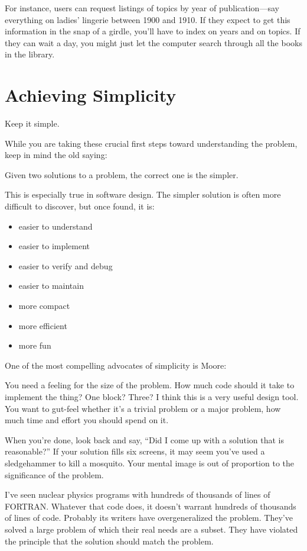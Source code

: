 For instance, users can request listings of topics by year of
publication---say everything on ladies' lingerie between 1900 and
1910.  If they expect to get this information in the snap of a girdle,
you'll have to index on years and on topics. If they can wait a day,
you might just let the computer search through all the books in the
library.

\section{Achieving Simplicity}

\begin{tip}
Keep it simple.
\end{tip}

\noindent While you are taking these crucial first steps toward
understanding the problem, keep in mind the old saying:

\begin{tfquot}
Given two solutions to a problem, the correct one is the simpler.
\end{tfquot}
This is especially true in software design. The simpler solution is often
more difficult to discover, but once found, it is:

\begin{itemize}
\item easier to understand
\item easier to implement
\item easier to verify and debug
\item easier to maintain
\item more compact
\item more efficient
\item more fun
\end{itemize}

\bigskip\blackline{2ex}
\noindent One of the most compelling advocates of simplicity is Moore:

\begin{tfquot}
You need a feeling for the size of the problem. How much code should
it take to implement the thing? One block? Three? I think this is a
very useful design tool. You want to gut-feel whether it's a trivial
problem or a major problem, how much time and effort you should spend
on it.

When you're done, look back and say, ``Did I come up with a solution
that is reasonable?'' If your solution fills six screens, it may seem
you've used a sledgehammer to kill a mosquito. Your mental image is
out of proportion to the significance of the problem.

I've seen nuclear physics programs with hundreds of thousands of lines
of FORTRAN. Whatever that code does, it doesn't warrant hundreds of
thousands of lines of code. Probably its writers have overgeneralized
the problem. They've solved a large problem of which their real needs
are a subset. They have violated the principle that the solution
should match the problem.
\end{tfquot}
\blackline{2ex}

